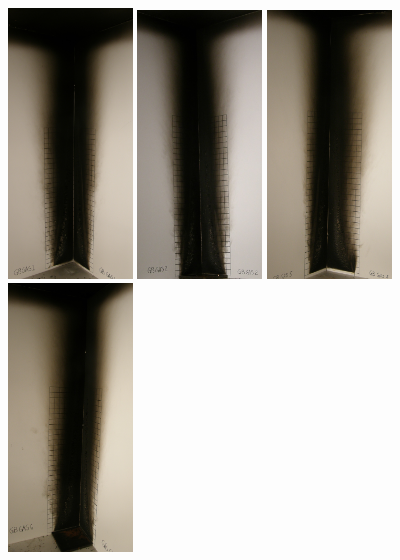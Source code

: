 \documentclass[twoside]{uocthesis}
\begin{document}
{\begin{figure}[p]
	\includegraphics[width=1.3in]{../Figures/GBGas1C_P5270387}
	\includegraphics[width=1.3in]{../Figures/GBGas2C_P5270454}
	\includegraphics[width=1.3in]{../Figures/GBGas5C_P5270493}
	\includegraphics[width=1.3in]{../Figures/GBGas6C_P5270526} \\


\end{figure}}
\end{document}
